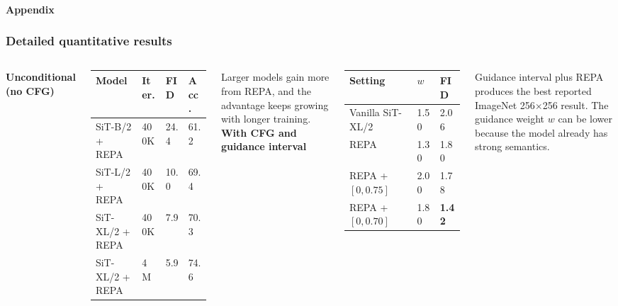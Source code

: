 \begin{frame}[t]
  \framesubtitle{Appendix}
  \frametitle{Detailed quantitative results}
  \begin{columns}[T,totalwidth=\textwidth]
    \textbf{Unconditional (no CFG)}
    \vspace{0.08cm}

    \begin{tabular}{L{2.4cm}C{0.8cm}C{0.9cm}C{0.9cm}}
      \toprule
      Model & Iter. & FID & Acc. \\
      \midrule
      SiT-B/2 + REPA & 400K & 24.4 & 61.2 \\
      SiT-L/2 + REPA & 400K & 10.0 & 69.4 \\
      SiT-XL/2 + REPA & 400K & 7.9 & 70.3 \\
      SiT-XL/2 + REPA & 4M & 5.9 & 74.6 \\
      \bottomrule
    \end{tabular}
    \vspace{0.16cm}
    {\small Larger models gain more from REPA, and the advantage
    keeps growing with longer training.}
    \textbf{With CFG and guidance interval}
    \vspace{0.08cm}

    \begin{tabular}{L{2.8cm}C{0.8cm}C{0.9cm}}
      \toprule
      Setting & \(w\) & FID \\
      \midrule
      Vanilla SiT-XL/2 & 1.50 & 2.06 \\
      REPA & 1.30 & 1.80 \\
      REPA + \([0, 0.75]\) & 2.00 & 1.78 \\
      REPA + \([0, 0.70]\) & 1.80 & \textbf{1.42} \\
      \bottomrule
    \end{tabular}
    \vspace{0.16cm}
    {\small Guidance interval plus REPA produces the best reported
    ImageNet 256\(\times\)256 result. The guidance weight \(w\) can be
    lower because the model already has strong semantics.}
  \end{columns}
\end{frame}

